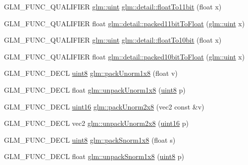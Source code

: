 \begin{DoxyCompactItemize}
G\+L\+M\+\_\+\+F\+U\+N\+C\+\_\+\+Q\+U\+A\+L\+I\+F\+I\+E\+R \hyperlink{stb__image_8c_a91ad9478d81a7aaf2593e8d9c3d06a14}{glm\+::uint} \hyperlink{namespaceglm_1_1detail_a62edbdbe89fe6282dd7909e6e4703796}{glm\+::detail\+::float\+To11bit} (float x)
\item 
G\+L\+M\+\_\+\+F\+U\+N\+C\+\_\+\+Q\+U\+A\+L\+I\+F\+I\+E\+R float \hyperlink{namespaceglm_1_1detail_a0148d59bbb6dbf6c0f296e73a527c225}{glm\+::detail\+::packed11bit\+To\+Float} (\hyperlink{stb__image_8c_a91ad9478d81a7aaf2593e8d9c3d06a14}{glm\+::uint} x)
\item 
G\+L\+M\+\_\+\+F\+U\+N\+C\+\_\+\+Q\+U\+A\+L\+I\+F\+I\+E\+R \hyperlink{stb__image_8c_a91ad9478d81a7aaf2593e8d9c3d06a14}{glm\+::uint} \hyperlink{namespaceglm_1_1detail_a2be3138712a0811602a183614221ad5c}{glm\+::detail\+::float\+To10bit} (float x)
\item 
G\+L\+M\+\_\+\+F\+U\+N\+C\+\_\+\+Q\+U\+A\+L\+I\+F\+I\+E\+R float \hyperlink{namespaceglm_1_1detail_afddea7fa02b61b01129777a21380edf4}{glm\+::detail\+::packed10bit\+To\+Float} (\hyperlink{stb__image_8c_a91ad9478d81a7aaf2593e8d9c3d06a14}{glm\+::uint} x)
\item 
G\+L\+M\+\_\+\+F\+U\+N\+C\+\_\+\+D\+E\+C\+L \hyperlink{stb__image_8c_adde6aaee8457bee49c2a92621fe22b79}{uint8} \hyperlink{group__gtc__packing_ga2f9963e5d762b10085b280d3662017ba}{glm\+::pack\+Unorm1x8} (float v)
\item 
G\+L\+M\+\_\+\+F\+U\+N\+C\+\_\+\+D\+E\+C\+L float \hyperlink{group__gtc__packing_ga32f3f2642df2ea87449d59fb614a8305}{glm\+::unpack\+Unorm1x8} (\hyperlink{stb__image_8c_adde6aaee8457bee49c2a92621fe22b79}{uint8} p)
\item 
G\+L\+M\+\_\+\+F\+U\+N\+C\+\_\+\+D\+E\+C\+L \hyperlink{stb__image_8c_a05f6b0ae8f6a6e135b0e290c25fe0e4e}{uint16} \hyperlink{group__gtc__packing_ga833288fc0d4a79f19d0db75a6843bfe6}{glm\+::pack\+Unorm2x8} (vec2 const \&v)
\item 
G\+L\+M\+\_\+\+F\+U\+N\+C\+\_\+\+D\+E\+C\+L vec2 \hyperlink{group__gtc__packing_ga96ce0c24339ee676e28a027fffd1edf6}{glm\+::unpack\+Unorm2x8} (\hyperlink{stb__image_8c_a05f6b0ae8f6a6e135b0e290c25fe0e4e}{uint16} p)
\item 
G\+L\+M\+\_\+\+F\+U\+N\+C\+\_\+\+D\+E\+C\+L \hyperlink{stb__image_8c_adde6aaee8457bee49c2a92621fe22b79}{uint8} \hyperlink{group__gtc__packing_ga26b6cd7a35c46c4b6a342f3b97b47423}{glm\+::pack\+Snorm1x8} (float s)
\item 
G\+L\+M\+\_\+\+F\+U\+N\+C\+\_\+\+D\+E\+C\+L float \hyperlink{group__gtc__packing_ga6f2bebf536fbf7c8b97d4b306bb3354e}{glm\+::unpack\+Snorm1x8} (\hyperlink{stb__image_8c_adde6aaee8457bee49c2a92621fe22b79}{uint8} p)

\end{DoxyCompactItemize}
